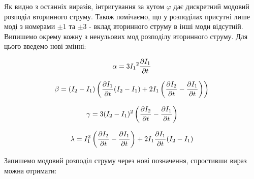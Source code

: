 Як видно з останніх виразів, інтригування за кутом $ \varphi $ дає дискретний 
модовий розподіл вторинного струму.  Також помічаємо, що у розподілах присутні 
лише моді з номерами $ \pm 1 $ та $ \pm 3 $ - вклад вторинного струму в інші
моди відсутній. Випишемо окрему кожну з ненульових мод розподілу вторинного 
струму. Для цього введемо нові змінні:

\begin{equation} \begin{aligned} \label{eq:alpha}
\alpha = 3 {I_1}^2 \frac{\partial I_1}{\partial t}
\end{aligned} \end{equation}

\begin{equation} \begin{aligned} \label{eq:beta}
\beta = ( I_2 - I_1 ) \left( \frac{\partial I_1}{\partial t} ( I_2 - I_1 ) + 
2 I_1 \left( \frac{\partial I_2}{\partial t} - \frac{\partial I_1}{\partial t} \right) \right)
\end{aligned} \end{equation}

\begin{equation} \begin{aligned} \label{eq:gamma}
\gamma = 3 ( I_2 - I_1 )^2 \left( \frac{\partial I_2}{\partial t} - \frac{\partial I_1}{\partial t} \right)
\end{aligned} \end{equation}

\begin{equation} \begin{aligned} \label{eq:lambda}
\lambda = I_1^2 \left( \frac{\partial I_2}{\partial t} - 
\frac{\partial I_1}{\partial t} \right) + 2 I_1 \frac{\partial I_1}{\partial t} (I_2 - I_1)
\end{aligned} \end{equation}

Запишемо модовий розподіл струму через нові позначення, спростивши вираз 
можна отримати:

